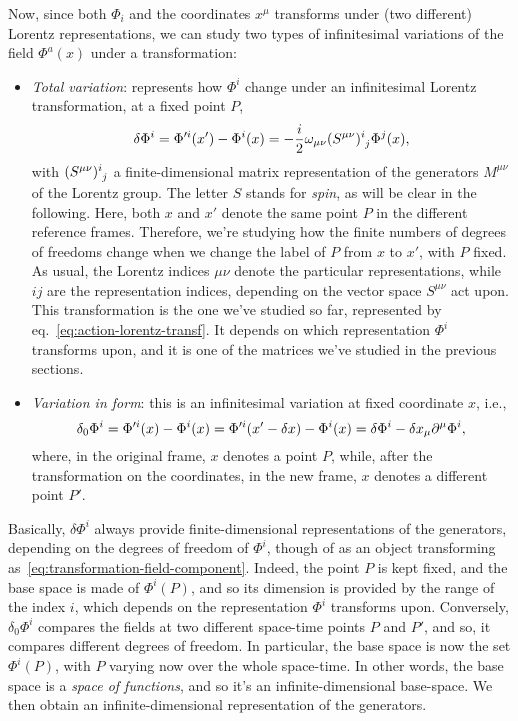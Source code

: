 Now, since both $\Phi_i$ and the coordinates $x^\mu$ transforms under (two different) Lorentz representations, we can study two types of infinitesimal variations of the field $\Phi^a(x)$ under a transformation:
\begin{itemize}
    \item \emph{Total variation}: represents how $\Phi^i$ change under an infinitesimal Lorentz transformation, at a fixed point $P$,
    \begin{equation}\label{eq:poincare-total-variation}
        \delta \Phi^i = \Phi'^i(x') - \Phi^i(x) = - \frac{i}{2} \omega_{\mu\nu} \tensor{(S^{\mu\nu})}{^i_j} \Phi^j(x) ,
    \end{equation}
    with $\tensor{(S^{\mu\nu})}{^i_j}$ a finite-dimensional matrix representation of the generators $M^{\mu\nu}$ of the Lorentz group. The letter $S$ stands for \emph{spin}, as will be clear in the following. Here, both $x$ and $x'$ denote the same point $P$ in the different reference frames. Therefore, we're studying how the finite numbers of degrees of freedoms change when we change the label of $P$ from $x$ to $x'$, with $P$ fixed. As usual, the Lorentz indices $\mu\nu$ denote the particular representations, while $ij$ are the representation indices, depending on the vector space $S^{\mu\nu}$ act upon. This transformation is the one we've studied so far, represented by eq.~\eqref{eq:action-lorentz-transf}. It depends on which representation $\Phi^i$ transforms upon, and it is one of the matrices we've studied in the previous sections.
    
    \item \emph{Variation in form}: this is an infinitesimal variation at fixed coordinate $x$, i.e.,
    \begin{equation}\label{eq:poincare-variation-in-form}
        \delta_0 \Phi^i = \Phi'^i(x) - \Phi^i(x) = \Phi'^i (x' - \delta x) - \Phi^i(x) = \delta \Phi^i - \delta x_\mu \partial^\mu \Phi^i ,
    \end{equation}
    where, in the original frame, $x$ denotes a point $P$, while, after the transformation on the coordinates, in the new frame, $x$ denotes a different point $P'$.
\end{itemize}

Basically, $\delta \Phi^i$ always provide finite-dimensional representations of the generators, depending on the degrees of freedom of $\Phi^i$, though of as an object transforming as~\eqref{eq:transformation-field-component}. Indeed, the point $P$ is kept fixed, and the base space is made of $\Phi^i(P)$, and so its dimension is provided by the range of the index $i$, which depends on the representation $\Phi^i$ transforms upon. Conversely, $\delta_0 \Phi^i$ compares the fields at two different space-time points $P$ and $P'$, and so, it compares different degrees of freedom. In particular, the base space is now the set $\Phi^i(P)$, with $P$ varying now over the whole space-time. In other words, the base space is a \emph{space of functions}, and so it's an infinite-dimensional base-space. We then obtain an infinite-dimensional representation of the generators.

